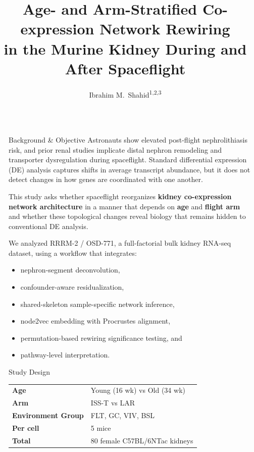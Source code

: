 \documentclass[final]{beamer}
\title{Age- and Arm-Stratified Co-expression Network Rewiring\\
in the Murine Kidney During and After Spaceflight}
\author{Ibrahim M.\ Shahid\textsuperscript{1,2,3}}
\institute{%
\textsuperscript{1}Middle College at UNCG \quad
\textsuperscript{2}Blue Marble Space Institute of Science \quad
\textsuperscript{3}NASA Human Research Program
}
\newlength{\sepwidth}
\newlength{\colwidth}
\newcommand{\separatorcolumn}{\begin{column}{\sepwidth}\end{column}}
\begin{document}
\begin{frame}[t]
\begin{columns}[t]
\separatorcolumn

\begin{column}{\colwidth}

\begin{block}{Background \& Objective}
Astronauts show elevated post-flight nephrolithiasis risk, and prior renal studies implicate distal nephron remodeling and transporter dysregulation during spaceflight. Standard differential expression (DE) analysis captures shifts in average transcript abundance, but it does not detect changes in how genes are coordinated with one another.

\medskip
This study asks whether spaceflight reorganizes \textbf{kidney co-expression network architecture} in a manner that depends on \textbf{age} and \textbf{flight arm} and whether these topological changes reveal biology that remains hidden to conventional DE analysis.

\medskip
We analyzed RRRM-2 / OSD-771, a full-factorial bulk kidney RNA-seq dataset, using a workflow that integrates:
\begin{itemize}
  \item nephron-segment deconvolution,
  \item confounder-aware residualization,
  \item shared-skeleton sample-specific network inference,
  \item node2vec embedding with Procrustes alignment,
  \item permutation-based rewiring significance testing, and
  \item pathway-level interpretation.
\end{itemize}
\end{block}

\begin{block}{Study Design}
\begin{center}
\renewcommand{\arraystretch}{1.35}
\begin{tabular}{>{\bfseries}l l}
Age & Young (16 wk) vs Old (34 wk) \\
Arm & ISS-T vs LAR \\
Environment Group & FLT, GC, VIV, BSL \\
Per cell & 5 mice \\
Total & 80 female C57BL/6NTac kidneys \\
\end{tabular}
\end{center}


\end{block}
\end{column}
\end{columns}
\end{frame}
\end{document}
